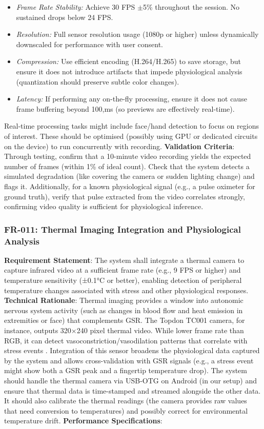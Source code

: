 \documentclass[11pt,a4paper]{report}
\begin{document}
\begin{itemize}
\item \textit{Frame Rate Stability:} Achieve 30 FPS $\pm$5\% throughout the session. No sustained drops below 24 FPS.
\item \textit{Resolution:} Full sensor resolution usage (1080p or higher) unless dynamically downscaled for performance with user consent.
\item \textit{Compression:} Use efficient encoding (H.264/H.265) to save storage, but ensure it does not introduce artifacts that impede physiological analysis (quantization should preserve subtle color changes).
\item \textit{Latency:} If performing any on-the-fly processing, ensure it does not cause frame buffering beyond 100,ms (so previews are effectively real-time).
\end{itemize} Real-time processing tasks might include face/hand detection to focus on regions of interest. These should be optimised (possibly using GPU or dedicated circuits on the device) to run concurrently with recording. \textbf{Validation Criteria}: Through testing, confirm that a 10-minute video recording yields the expected number of frames (within 1\% of ideal count). Check that the system detects a simulated degradation (like covering the camera or sudden lighting change) and flags it. Additionally, for a known physiological signal (e.g., a pulse oximeter for ground truth), verify that pulse extracted from the video correlates strongly, confirming video quality is sufficient for physiological inference. \subsubsection*{FR-011: Thermal Imaging Integration and Physiological Analysis}
\textbf{Requirement Statement}: The system shall integrate a thermal camera to capture infrared video at a sufficient frame rate (e.g., 9 FPS or higher) and temperature sensitivity (±0.1°C or better), enabling detection of peripheral temperature changes associated with stress and other physiological responses. \textbf{Technical Rationale}: Thermal imaging provides a window into autonomic nervous system activity (such as changes in blood flow and heat emission in extremities or face) that complements GSR. The Topdon TC001 camera, for instance, outputs 320$\times$240 pixel thermal video. While lower frame rate than RGB, it can detect vasoconstriction/vasodilation patterns that correlate with stress events \cite{Ring2012ThermalMed}. Integration of this sensor broadens the physiological data captured by the system and allows cross-validation with GSR signals (e.g., a stress event might show both a GSR peak and a fingertip temperature drop). The system should handle the thermal camera via USB-OTG on Android (in our setup) and ensure that thermal data is time-stamped and streamed alongside the other data. It should also calibrate the thermal readings (the camera provides raw values that need conversion to temperatures) and possibly correct for environmental temperature drift. \textbf{Performance Specifications}:
\end{document}

